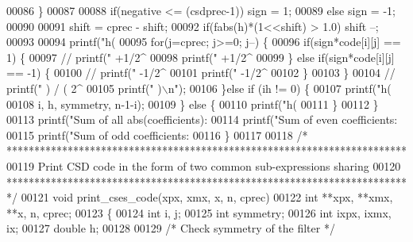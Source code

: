 \begin{DoxyCode}
00086             \}
00087 
00088             \textcolor{keywordflow}{if}(negative <= (csdprec-1)) sign = 1;
00089             \textcolor{keywordflow}{else} sign = -1;
00090 
00091             shift = cprec - shift;
00092             \textcolor{keywordflow}{if}(fabs(h)*(1<<shift) > 1.0) shift --;
00093 
00094             printf(\textcolor{stringliteral}{"h(%
00095             \textcolor{keywordflow}{for}(j=cprec; j>=0; j--) \{
00096                 \textcolor{keywordflow}{if}(sign*code[i][j] == 1) \{
00097                     \textcolor{comment}{// printf(" +1/2^%
00098                     printf(\textcolor{stringliteral}{" +1/2^%
00099                 \} \textcolor{keywordflow}{else} \textcolor{keywordflow}{if}(sign*code[i][j] == -1) \{
00100                     \textcolor{comment}{// printf(" -1/2^%
00101                     printf(\textcolor{stringliteral}{" -1/2^%
00102                 \}
00103             \}
00104             \textcolor{comment}{// printf(" ) / ( 2^%
00105             printf(\textcolor{stringliteral}{" )\(\backslash\)n"});
00106         \}\textcolor{keywordflow}{else} \textcolor{keywordflow}{if} (ih != 0) \{
00107             printf(\textcolor{stringliteral}{"h(%
00108                 i, h, symmetry, n-1-i);
00109         \} \textcolor{keywordflow}{else} \{
00110             printf(\textcolor{stringliteral}{"h(%
00111         \}
00112     \}
00113     printf(\textcolor{stringliteral}{"Sum of all abs(coefficients): %
00114     printf(\textcolor{stringliteral}{"Sum of even coefficients: %
00115     printf(\textcolor{stringliteral}{"Sum of odd  coefficients: %
00116 \}
00117 
00118 \textcolor{comment}{/* ************************************************************************ }
00119 \textcolor{comment}{   Print CSD code in the form of two common sub-expressions sharing }
00120 \textcolor{comment}{   ************************************************************************ */}
00121 \textcolor{keywordtype}{void} print_cses_code(xpx, xmx, x, n, cprec)
00122 int **xpx, **xmx, **x, n, cprec;
00123 \{
00124     \textcolor{keywordtype}{int} i, j;
00125     \textcolor{keywordtype}{int} symmetry;
00126     \textcolor{keywordtype}{int} ixpx, ixmx, ix;
00127     \textcolor{keywordtype}{double} h;
00128 
00129     \textcolor{comment}{/* Check symmetry of the filter */}
}}}}}}}}}}}
\end{DoxyCode}
